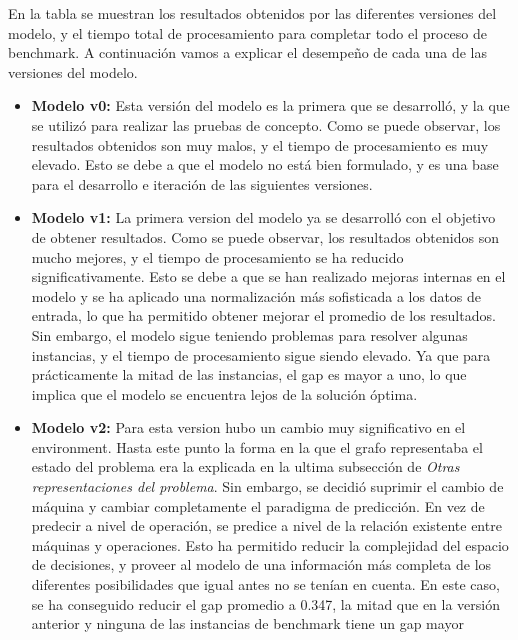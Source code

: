 En la tabla se muestran los resultados obtenidos por las
diferentes versiones del modelo, y el tiempo total de procesamiento
para completar todo el proceso de benchmark. A continuación vamos a
explicar el desempeño de cada una de las versiones del modelo.
\begin{itemize}
    \item \textbf{Modelo v0:} Esta versión del modelo es la primera que se
        desarrolló, y la que se utilizó para realizar las pruebas de
        concepto. Como se puede observar, los resultados obtenidos son
        muy malos, y el tiempo de procesamiento es muy elevado. Esto
        se debe a que el modelo no está bien formulado, y es una base
        para el desarrollo e iteración de las siguientes versiones.
    \item \textbf{Modelo v1:} La primera version del modelo ya se desarrolló 
        con el objetivo de obtener resultados. Como se
        puede observar, los resultados obtenidos son mucho mejores, y el
        tiempo de procesamiento se ha reducido significativamente. Esto se 
        debe a que se han realizado mejoras internas en el modelo y se ha aplicado una
        normalización más sofisticada a los datos de entrada, lo que
        ha permitido obtener mejorar el promedio de los resultados. Sin 
        embargo, el modelo sigue teniendo problemas para resolver algunas
        instancias, y el tiempo de procesamiento sigue siendo elevado. Ya que
        para prácticamente la mitad de las instancias, el gap es mayor a uno,
        lo que implica que el modelo se encuentra lejos de la solución óptima.
    \item \textbf{Modelo v2:} Para esta version hubo un cambio muy significativo 
        en el environment. Hasta este punto la forma en la que el grafo representaba
        el estado del problema era la explicada en la ultima subsección de
        \textit{Otras representaciones del problema}. Sin embargo, se decidió suprimir 
        el cambio de máquina y cambiar completamente el paradigma de predicción. En vez
        de predecir a nivel de operación, se predice a nivel de la relación existente 
        entre máquinas y operaciones. Esto ha permitido reducir la complejidad del 
        espacio de decisiones, y proveer al modelo de una información más completa de
        los diferentes posibilidades que igual antes no se tenían en cuenta. En este
        caso, se ha conseguido reducir el gap promedio a 0.347, la mitad que en la
        versión anterior y ninguna de las instancias de benchmark tiene un gap mayor

\end{itemize}
